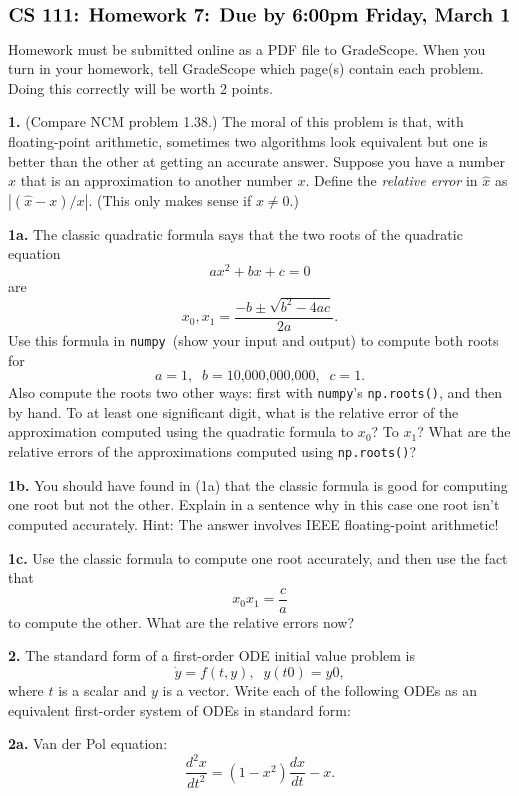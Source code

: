 \documentclass[11pt]{article}
\newcommand{\numpy}{{\tt numpy}}            %
\begin{document}
$$\mbox{\Large \bf CS 111: Homework 7: Due by 6:00pm Friday, March 1}$$
\par\bigskip\noindent
Homework must be submitted online as a PDF file to GradeScope.
When you turn in your homework, 
tell GradeScope which page(s) contain each problem. 
Doing this correctly will be worth 2 points.

\par\bigskip
{\bf 1.} (Compare NCM problem 1.38.)
The moral of this problem is that, with floating-point arithmetic,
sometimes two algorithms look equivalent but one is better than the other
at getting an accurate answer.
Suppose you have a number $\hat x$ that is an approximation to another number $x$.
Define the {\em relative error} in $\hat x$ as 
$|(\hat x - x) / x |$.
(This only makes sense if $x\ne0$.)

\par\medskip
{\bf 1a.}
The classic quadratic formula says that the two roots of the quadratic equation
$$ ax^2 + bx + c = 0$$
are
$$ x_0, x_1 = \frac{-b\pm\sqrt{b^2-4ac}}{2a}. $$
Use this formula in \numpy\ (show your input and output) to compute both roots for
$$ a = 1, \;\; b = \mbox{10,000,000,000}, \;\; c = 1. $$
Also compute the roots two other ways: 
first with \numpy's {\tt np.roots()}, and then by hand.
To at least one significant digit, what is the relative error of the 
approximation computed using the quadratic formula to $x_0$? To $x_1$?
What are the relative errors of the approximations computed using {\tt np.roots()}?

\par\medskip
{\bf 1b.}
You should have found in (1a) that the classic formula is good for 
computing one root but not the other. 
Explain in a sentence why in this case one root isn't computed accurately.
Hint: The answer involves IEEE floating-point arithmetic!

\par\medskip
{\bf 1c.}
Use the classic formula to compute one root accurately, and then use the
fact that
$$ x_0x_1 = \frac{c}{a} $$
to compute the other.
What are the relative errors now?

\par\bigskip
{\bf 2.}
The standard form of a first-order ODE initial value problem is
$$ \dot y = f(t, y), \;\; y(t0) = y0, $$
where $t$ is a scalar and $y$ is a vector.
Write each of the following ODEs as an equivalent first-order system
of ODEs in standard form:

\par\bigskip
{\bf 2a.} Van der Pol equation:
$$ \frac{d^2 x}{dt^2} = (1-x^2)\frac{dx}{dt} - x . $$
\end{document}
